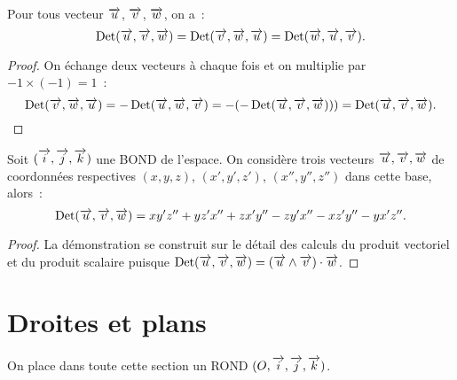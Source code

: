 \begin{cor}
  Pour tous vecteur \(\vu\), \(\vv\), \(\vw\), on a~:
  \begin{equation}
    \Det(\vu,\vv,\vw)=\Det(\vv,\vw,\vu)=\Det(\vw,\vu,\vv).
  \end{equation}
\end{cor}
\begin{proof}
  On échange deux vecteurs à chaque fois et on multiplie par \(-1\times(-1)=1\)~:
  \begin{equation}
   \Det(\vv,\vw,\vu)=-\Det(\vu,\vw,\vv) =-(-\Det(\vu,\vv,\vw)))=\Det(\vu,\vv,\vw).
  \end{equation}
\end{proof}
\begin{prop}
  Soit \(\bondtrois\) une BOND de l'espace. On considère trois vecteurs \(\vu,\vv,\vw\) de coordonnées respectives \((x,y,z)\), \((x',y',z')\), \((x'',y'',z'')\) dans cette base, alors~:
  \begin{equation}
    \Det(\vu,\vv,\vw)=xy'z''+yz'x''+zx'y''-zy'x''-xz'y''-yx'z''.
  \end{equation}
\end{prop}
\begin{proof}
  La démonstration se construit sur le détail des calculs du produit vectoriel et du produit scalaire puisque \(\Det(\vu,\vv,\vw)=(\vu\wedge\vv)\cdot\vw\).
\end{proof}

\section{Droites et plans}
On place dans toute cette section un ROND \(\rondtrois\).

